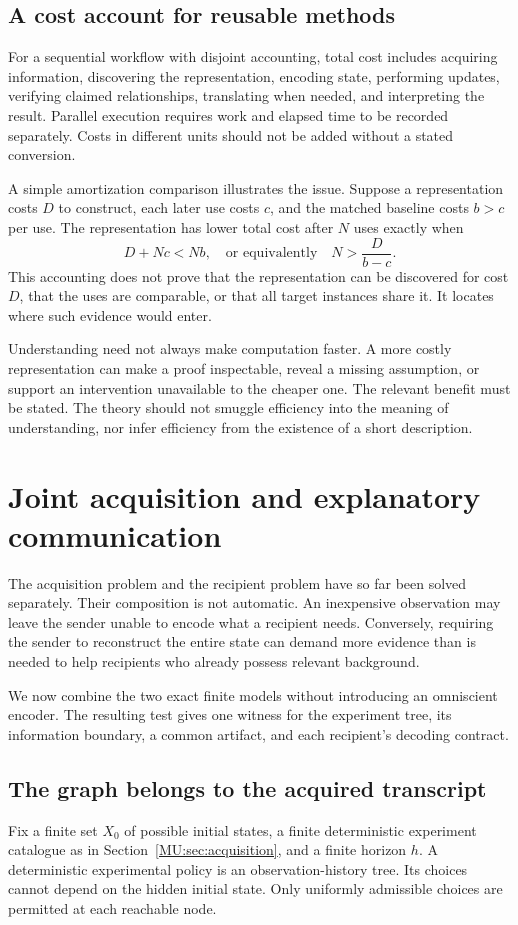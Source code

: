 \subsection{A cost account for reusable methods}
For a sequential workflow with disjoint accounting, total cost includes acquiring information, discovering the representation, encoding state, performing updates, verifying claimed relationships, translating when needed, and interpreting the result. Parallel execution requires work and elapsed time to be recorded separately. Costs in different units should not be added without a stated conversion.

A simple amortization comparison illustrates the issue. Suppose a representation costs $D$ to construct, each later use costs $c$, and the matched baseline costs $b>c$ per use. The representation has lower total cost after $N$ uses exactly when
\[
D+Nc<Nb,\quad\text{or equivalently}\quad N>\frac{D}{b-c}.
\]
This accounting does not prove that the representation can be discovered for cost $D$, that the uses are comparable, or that all target instances share it. It locates where such evidence would enter.

Understanding need not always make computation faster. A more costly representation can make a proof inspectable, reveal a missing assumption, or support an intervention unavailable to the cheaper one. The relevant benefit must be stated. The theory should not smuggle efficiency into the meaning of understanding, nor infer efficiency from the existence of a short description.

\section{Joint acquisition and explanatory communication}\label{MU:sec:joint-synthesis}
The acquisition problem and the recipient problem have so far been solved separately. Their composition is not automatic. An inexpensive observation may leave the sender unable to encode what a recipient needs. Conversely, requiring the sender to reconstruct the entire state can demand more evidence than is needed to help recipients who already possess relevant background.

We now combine the two exact finite models without introducing an omniscient encoder. The resulting test gives one witness for the experiment tree, its information boundary, a common artifact, and each recipient's decoding contract.

\subsection{The graph belongs to the acquired transcript}
Fix a finite set $X_0$ of possible initial states, a finite deterministic experiment catalogue as in Section~\ref{MU:sec:acquisition}, and a finite horizon $h$. A deterministic experimental policy is an observation-history tree. Its choices cannot depend on the hidden initial state. Only uniformly admissible choices are permitted at each reachable node.

